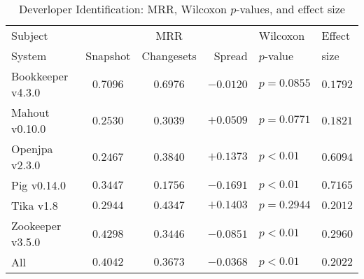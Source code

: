 \begin{table}[t]
\centering
\caption{Deverloper Identification: MRR, Wilcoxon $p$-values, and effect size}
\begin{tabular}{l|ccr|ll}
\toprule
Subject & & MRR & & Wilcoxon & Effect \\
System  &  Snapshot & Changesets & Spread & $p$-value & size \\
\midrule
Bookkeeper v4.3.0 & $\bm{0.7096}$ & $0.6976$ & $-0.0120$ & $p = 0.0855$ & $0.1792$ \\
Mahout v0.10.0 & $0.2530$ & $\bm{0.3039}$ & $+0.0509$ & $p = 0.0771$ & $0.1821$ \\
Openjpa v2.3.0 & $0.2467$ & $\bm{0.3840}$ & $+0.1373$ & $p < 0.01$ & $0.6094$ \\
Pig v0.14.0 & $\bm{0.3447}$ & $0.1756$ & $-0.1691$ & $p < 0.01$ & $0.7165$ \\
Tika v1.8 & $0.2944$ & $\bm{0.4347}$ & $+0.1403$ & $p = 0.2944$ & $0.2012$ \\
Zookeeper v3.5.0 & $\bm{0.4298}$ & $0.3446$ & $-0.0851$ & $p < 0.01$ & $0.2960$ \\
\midrule
All & $\bm{0.4042}$ & $0.3673$ & $-0.0368$ & $p < 0.01$ & $0.2022$ \\
\bottomrule
\end{tabular}
\label{table:triage_rq1}
\end{table}
